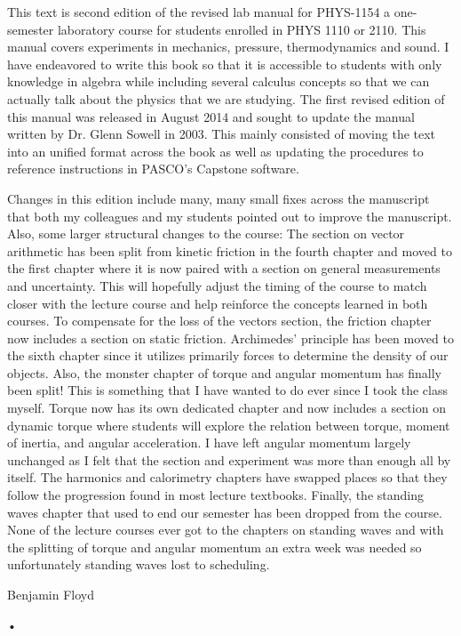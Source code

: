 \documentclass[main.tex]{subfiles}
\begin{document}
This text is second edition of the revised lab manual for PHYS-1154 a one-semester laboratory course for students enrolled in PHYS 1110 or 2110. This manual covers experiments in mechanics, pressure, thermodynamics and sound. I have endeavored to write this book so that it is accessible to students with only knowledge in algebra while including several calculus concepts so that we can actually talk about the physics that we are studying. The first revised edition of this manual was released in August 2014 and sought to update the manual written by Dr. Glenn Sowell in 2003. This mainly consisted of moving the text into an unified format across the book as well as updating the procedures to reference instructions in PASCO's Capstone software.

Changes in this edition include many, many small fixes across the manuscript that both my colleagues and my students pointed out to improve the manuscript. Also, some larger structural changes to the course:  The section on vector arithmetic has been split from kinetic friction in the fourth chapter and moved to the first chapter where it is now paired with a section on general measurements and uncertainty. This will hopefully adjust the timing of the course to match closer with the lecture course and help reinforce the concepts learned in both courses. To compensate for the loss of the vectors section, the friction chapter now includes a section on static friction. Archimedes' principle has been moved to the sixth chapter since it utilizes primarily forces to determine the density of our objects. Also, the monster chapter of torque and angular momentum has finally been split! This is something that I have wanted to do ever since I took the class myself. Torque now has its own dedicated chapter and now includes a section on dynamic torque where students will explore the relation between torque, moment of inertia, and angular acceleration. I have left angular momentum largely unchanged as I felt that the section and experiment was more than enough all by itself.  The harmonics and calorimetry chapters have swapped places so that they follow the progression found in most lecture textbooks. Finally, the standing waves chapter that used to end our semester has been dropped from the course. None of the lecture courses ever got to the chapters on standing waves and with the splitting of torque and angular momentum an extra week was needed so unfortunately standing waves lost to scheduling.

\begin{flushright}
Benjamin Floyd
\end{flushright}•
\end{document}
